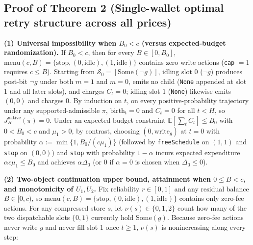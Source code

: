 \documentclass[11pt,letterpaper]{article}
\begin{document}
\subsection{Proof of Theorem 2 (Single-wallet optimal retry structure
across all
prices)}\label{proof-of-theorem-2-single-wallet-optimal-retry-structure-across-all-prices}

\textbf{(1) Universal impossibility when \(B_0 < c\) (versus
expected-budget randomization).} If \(B_0 < c\), then for every
\(B \in [0, B_0]\),
\(\mathrm{menu}(c, B) = \{\mathrm{stop}, (0, \mathrm{idle}), (1, \mathrm{idle})\}\)
contains zero write actions (\texttt{cap} \(= 1\) requires \(c \le B\)).
Starting from \(\mathcal{S}_0 = [\mathrm{Some}(\neg g)]\), idling slot
\(0\) (\(\neg g\)) produces post-bit \(\neg g\) under both \(m = 1\) and
\(m = 0\), emits no child (\texttt{None} appended at slot \(1\) and all
later slots), and charges \(C_t = 0\); idling slot \(1\) (\texttt{None})
likewise emits \((0,0)\) and charges \(0\). By induction on \(t\), on
every positive-probability trajectory under any supported-admissible
\(\pi\), \(\mathrm{birth}_t = 0\) and \(C_t = 0\) for all \(t < H\), so
\(J_H^{\mathrm{native}}(\pi) = 0\). Under an expected-budget constraint
\(\mathbb{E}[\sum_t C_t] \le B_0\) with \(0 < B_0 < c\) and
\(\mu_1 > 0\), by contrast, choosing \((0, \mathrm{write}_g)\) at
\(t = 0\) with probability \(\alpha := \min\{1, B_0/(c\mu_1)\}\)
(followed by \texttt{freeSchedule} on \((1,1)\) and \texttt{stop} on
\((0,0)\)) and \texttt{stop} with probability \(1 - \alpha\) incurs
expected expenditure \(\alpha c \mu_1 \le B_0\) and achieves
\(\alpha \Delta_0\) (or \(0\) if \(\alpha = 0\) is chosen when
\(\Delta_0 \le 0\)).

\textbf{(2) Two-object continuation upper bound, attainment when
\(0 \le B < c\), and monotonicity of \(U_1, U_2\).} Fix reliability
\(r \in [0,1]\) and any residual balance \(B \in [0, c)\), so
\(\mathrm{menu}(c, B) = \{\mathrm{stop}, (0, \mathrm{idle}), (1, \mathrm{idle})\}\)
contains only zero-fee actions. For any compressed store \(s\), let
\(\nu(s) \in \{0, 1, 2\}\) count how many of the two dispatchable slots
\(\{0, 1\}\) currently hold \(\mathrm{Some}(g)\). Because zero-fee
actions never write \(g\) and never fill slot \(1\) once \(t \ge 1\),
\(\nu(s)\) is nonincreasing along every step:
\end{document}
